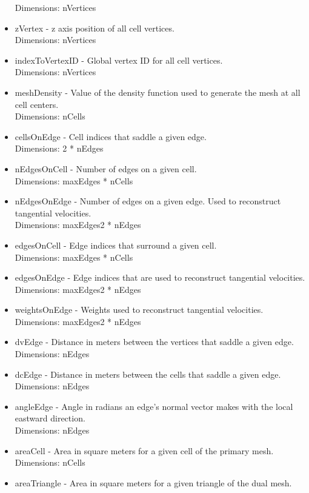 \documentclass[11pt]{report}
\begin{document}
\begin{itemize}
		  Dimensions: nVertices
	\item zVertex - z axis position of all cell vertices. \\
		  Dimensions: nVertices
	\item indexToVertexID - Global vertex ID for all cell vertices. \\
		  Dimensions: nVertices
	\item meshDensity - Value of the density function used to generate the mesh at all cell centers. \\
		  Dimensions: nCells
	\item cellsOnEdge - Cell indices that saddle a given edge. \\
		  Dimensions: 2 * nEdges
	\item nEdgesOnCell - Number of edges on a given cell. \\
		  Dimensions: maxEdges * nCells
	\item nEdgesOnEdge - Number of edges on a given edge. Used to reconstruct tangential velocities. \\
		  Dimensions: maxEdges2 * nEdges
	\item edgesOnCell - Edge indices that surround a given cell. \\
		  Dimensions: maxEdges * nCells
	\item edgesOnEdge - Edge indices that are used to reconstruct tangential velocities. \\
		  Dimensions: maxEdges2 * nEdges
	\item weightsOnEdge - Weights used to reconstruct tangential velocities. \\
		  Dimensions: maxEdges2 * nEdges
	\item dvEdge - Distance in meters between the vertices that saddle a given edge. \\
		  Dimensions: nEdges
	\item dcEdge - Distance in meters between the cells that saddle a given edge. \\
		  Dimensions: nEdges
	\item angleEdge - Angle in radians an edge's normal vector makes with the local eastward direction. \\
		  Dimensions: nEdges
	\item areaCell - Area in square meters for a given cell of the primary mesh. \\
		  Dimensions: nCells
	\item areaTriangle - Area in square meters for a given triangle of the dual mesh. \\

\end{itemize}
\end{document}
